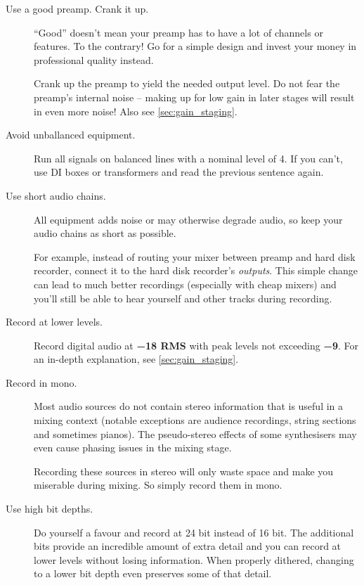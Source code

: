 \begin{description}

\item[Use a good preamp.  Crank it up.]  ``Good'' doesn't mean your
  preamp has to have a lot of channels or features.  To the contrary!
  Go for a simple design and invest your money in professional quality
  instead.

  Crank up the preamp to yield the needed output level.  Do not fear
  the preamp's internal noise -- making up for low gain in later
  stages will result in even more noise!  Also see
  \ref{sec:gain_staging}.

\item[Avoid unballanced equipment.]  Run all signals on balanced lines
  with a nominal level of \SI[addsign=all]{+4}{\dBu}.  If you can't,
  use DI boxes or transformers and read the previous sentence again.

\item[Use short audio chains.]  All equipment adds noise or may
  otherwise degrade audio, so keep your audio chains as short as
  possible.

  For example, instead of routing your mixer between preamp and hard
  disk recorder, connect it to the hard disk recorder's
  \emph{outputs}.  This simple change can lead to much better
  recordings (especially with cheap mixers) and you'll still be able
  to hear yourself and other tracks during recording.

\item[Record at lower levels.]  Record digital audio at
  \textbf{\SI{-18}{\dBFS} RMS} with peak levels not exceeding
  \textbf{\SI{-9}{\dBFS}}.  For an in-depth explanation, see
  \ref{sec:gain_staging}.

\item[Record in mono.]  Most audio sources do not contain stereo
  information that is useful in a mixing context (notable exceptions
  are audience recordings, string sections and sometimes pianos).  The
  pseudo-stereo effects of some synthesisers may even cause phasing
  issues in the mixing stage.

  Recording these sources in stereo will only waste space and make you
  miserable during mixing.  So simply record them in mono.

\item[Use high bit depths.]  Do yourself a favour and record at 24 bit
  instead of 16 bit.  The additional bits provide an incredible amount
  of extra detail and you can record at lower levels without losing
  information.  When properly dithered, changing to a lower bit depth
  even preserves some of that detail.


\end{description}
